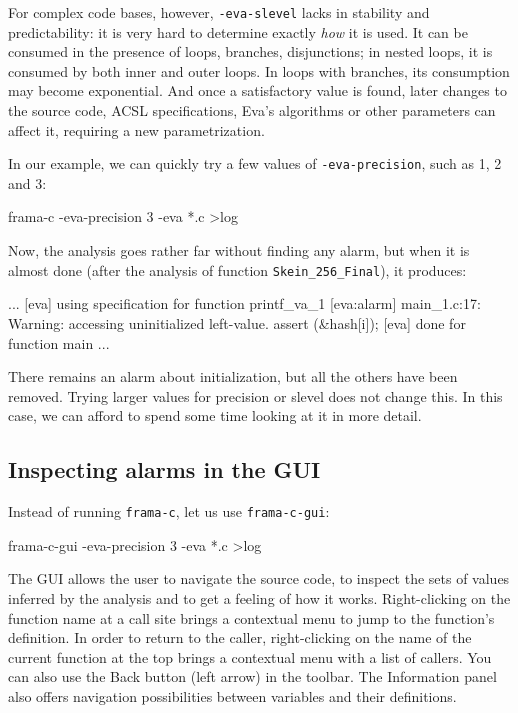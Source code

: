 \documentclass[web]{frama-c-book}
\newcommand{\Eva}{\textsf{Eva}}
\begin{document}
For complex code bases, however, \verb|-eva-slevel| lacks in stability and
predictability: it is very hard to determine exactly {\em how} it is used.
It can be consumed in the presence of loops, branches, disjunctions;
in nested loops, it is consumed by both inner and outer loops.
In loops with branches, its consumption may become exponential.
And once a satisfactory value is found, later changes to the source code,
ACSL specifications, \Eva{}'s algorithms or other parameters can affect it,
requiring a new parametrization.

In our example, we can quickly try a few values of \verb|-eva-precision|,
such as 1, 2 and 3:

\begin{shell}
frama-c -eva-precision 3 -eva *.c >log
\end{shell}

Now, the analysis goes rather far without finding any alarm,
but when it is almost done (after the analysis of function
\lstinline|Skein_256_Final|), it produces:
\begin{logs}
...
[eva] using specification for function printf_va_1
[eva:alarm] main_1.c:17: Warning: 
  accessing uninitialized left-value. assert \initialized(&hash[i]);
[eva] done for function main
...
\end{logs}

There remains an alarm about initialization, but all the others have been
removed. Trying larger values for precision or slevel does not change this.
In this case, we can afford to spend some time looking at it in more detail.

\subsection{Inspecting alarms in the GUI}

Instead of running \verb|frama-c|, let us use \verb|frama-c-gui|:

\begin{shell}
frama-c-gui -eva-precision 3 -eva *.c >log
\end{shell}

The GUI allows the user to navigate the source code, to inspect the sets of
values inferred by the analysis and to get
a feeling of how it works. Right-clicking on the function name
at a call site brings a contextual menu to jump
to the function's definition.
In order to return to the caller,
right-clicking on the name of the current function at the top
brings a contextual menu with a list of callers.
You can also use the Back button (left arrow) in the toolbar.
The Information panel also offers navigation possibilities between
variables and their definitions.
\end{document}
